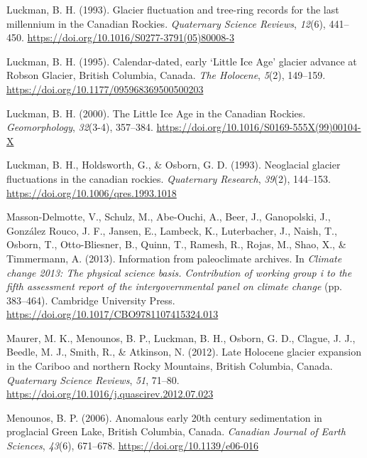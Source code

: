 \documentclass[
  letterpaper,
  DIV=11,
  numbers=noendperiod]{scrartcl}
\newlength{\cslhangindent}
\newlength{\cslentryspacingunit} %
\newenvironment{CSLReferences}[2] %
 {%
  \setlength{\parindent}{0pt}
  \ifodd #1
  \let\oldpar\par
  \def\par{\hangindent=\cslhangindent\oldpar}
  \fi
  \setlength{\parskip}{#2\cslentryspacingunit}
 }%
 {}
\begin{document}
\begin{CSLReferences}{1}{0}
\leavevmode{}%
Luckman, B. H. (1993). {Glacier fluctuation and tree-ring records for
the last millennium in the Canadian Rockies}. \emph{Quaternary Science
Reviews}, \emph{12}(6), 441--450.
\url{https://doi.org/10.1016/S0277-3791(05)80008-3}

\leavevmode{}%
Luckman, B. H. (1995). {Calendar-dated, early `Little Ice Age' glacier
advance at Robson Glacier, British Columbia, Canada}. \emph{The
Holocene}, \emph{5}(2), 149--159.
\url{https://doi.org/10.1177/095968369500500203}

\leavevmode{}%
Luckman, B. H. (2000). {The Little Ice Age in the Canadian Rockies}.
\emph{Geomorphology}, \emph{32}(3-4), 357--384.
\url{https://doi.org/10.1016/S0169-555X(99)00104-X}

\leavevmode{}%
Luckman, B. H., Holdsworth, G., \& Osborn, G. D. (1993). {Neoglacial
glacier fluctuations in the canadian rockies}. \emph{Quaternary
Research}, \emph{39}(2), 144--153.
\url{https://doi.org/10.1006/qres.1993.1018}

\leavevmode{}%
Masson-Delmotte, V., Schulz, M., Abe-Ouchi, A., Beer, J., Ganopolski,
J., González Rouco, J. F., Jansen, E., Lambeck, K., Luterbacher, J.,
Naish, T., Osborn, T., Otto-Bliesner, B., Quinn, T., Ramesh, R., Rojas,
M., Shao, X., \& Timmermann, A. (2013). {Information from paleoclimate
archives}. In \emph{Climate change 2013: The physical science basis.
Contribution of working group i to the fifth assessment report of the
intergovernmental panel on climate change} (pp. 383--464). Cambridge
University Press. \url{https://doi.org/10.1017/CBO9781107415324.013}

\leavevmode{}%
Maurer, M. K., Menounos, B. P., Luckman, B. H., Osborn, G. D., Clague,
J. J., Beedle, M. J., Smith, R., \& Atkinson, N. (2012). {Late Holocene
glacier expansion in the Cariboo and northern Rocky Mountains, British
Columbia, Canada}. \emph{Quaternary Science Reviews}, \emph{51}, 71--80.
\url{https://doi.org/10.1016/j.quascirev.2012.07.023}

\leavevmode{}%
Menounos, B. P. (2006). {Anomalous early 20th century sedimentation in
proglacial Green Lake, British Columbia, Canada}. \emph{Canadian Journal
of Earth Sciences}, \emph{43}(6), 671--678.
\url{https://doi.org/10.1139/e06-016}


\end{CSLReferences}
\end{document}
